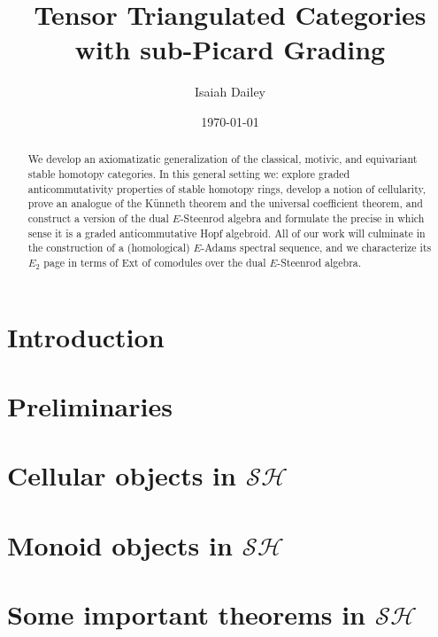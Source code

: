 \documentclass[openany, amssymb]{amsart}
\title{Tensor Triangulated Categories with sub-Picard Grading}
\author{Isaiah Dailey}
\date{\today}
\theoremstyle{plain}
\theoremstyle{definition}
\newcommand{\cSH}{\mathcal{SH}}
\newcommand{\Ext}{\mathrm{Ext}}
\newcommand{\0}{\mathbf{0}}
\renewcommand{\(}{\left(}
\renewcommand{\)}{\right)}
\renewcommand{\1}{\mbf{1}}
\begin{document}
\begin{abstract}
  We develop an axiomatizatic generalization of the classical, motivic, and equivariant stable homotopy categories. In this general setting we: explore graded anticommutativity properties of stable homotopy rings,  develop a notion of cellularity, prove an analogue of the K\"unneth theorem and the universal coefficient theorem, and construct a version of the dual $E$-Steenrod algebra and formulate the precise in which sense it is a graded anticommutative Hopf algebroid. All of our work will culminate in the construction of a (homological) $E$-Adams spectral sequence, and we characterize its $E_2$ page in terms of $\Ext$ of comodules over the dual $E$-Steenrod algebra.
\end{abstract}

\maketitle

\tableofcontents


\section{Introduction}\label{section:intro}



\section{Preliminaries}\label{section:prelims}



\section{Cellular objects in \texorpdfstring{$\cSH$}{SH}}\label{section:cellular}



\section{Monoid objects in \texorpdfstring{$\cSH$}{SH}}\label{section:monoid_in_SH}



\section{Some important theorems in \texorpdfstring{$\cSH$}{SH}}\label{section:important}
\end{document}
